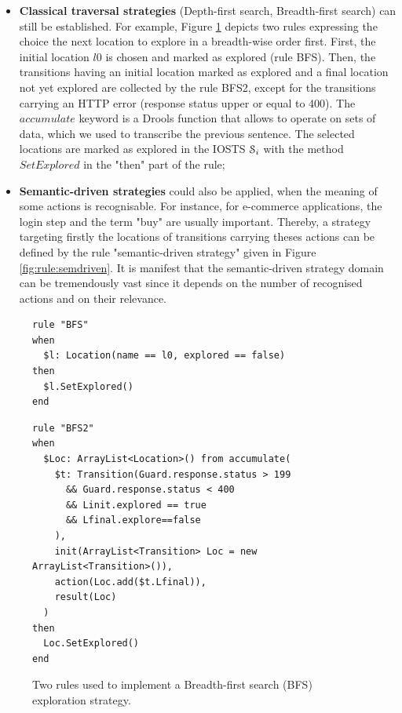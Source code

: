 \begin{itemize}
    \item \textbf{Classical traversal strategies} (Depth-first
        search, Breadth-first search) can still be established.
        For example, Figure \ref{fig:rule:bfs} depicts two rules
        expressing the choice the next location to explore in a
        breadth-wise order first. First, the initial location
        $l0$ is chosen and marked as explored (rule BFS).  Then,
        the transitions having an initial location marked as
        explored and a final location not yet explored are
        collected by the rule BFS2, except for the transitions
        carrying an HTTP error (response status upper or equal to
        400).  The $accumulate$ keyword is a Drools function that
        allows to operate on sets of data, which we used to
        transcribe the previous sentence.  The selected locations
        are marked as explored in the IOSTS $\EuScript{S}_i$ with
        the method $SetExplored$ in the "then" part of the rule;

    \item \textbf{Semantic-driven strategies} could also be
        applied, when the meaning of some actions is
        recognisable. For instance, for e-commerce applications,
        the login step and the term "buy" are usually important.
        Thereby, a strategy targeting firstly the locations of
        transitions carrying theses actions can be defined by the
        rule "semantic-driven strategy" given in Figure
        \ref{fig:rule:semdriven}.  It is manifest that the
        semantic-driven strategy domain can be tremendously vast
        since it depends on the number of recognised actions and
        on their relevance.
\end{itemize}

\begin{figure}[h]
\begin{framed}
\begin{BVerbatim}
rule "BFS"
when
  $l: Location(name == l0, explored == false)
then
  $l.SetExplored()
end
\end{BVerbatim}
\end{framed}

\begin{framed}
\begin{BVerbatim}
rule "BFS2"
when
  $Loc: ArrayList<Location>() from accumulate(
    $t: Transition(Guard.response.status > 199
      && Guard.response.status < 400
      && Linit.explored == true
      && Lfinal.explore==false
    ),
    init(ArrayList<Transition> Loc = new ArrayList<Transition>()),
    action(Loc.add($t.Lfinal)),
    result(Loc)
  )
then
  Loc.SetExplored()
end
\end{BVerbatim}
\end{framed}

\caption{Two rules used to implement a Breadth-first search (BFS)
exploration strategy.}
\label{fig:rule:bfs}
\end{figure}

